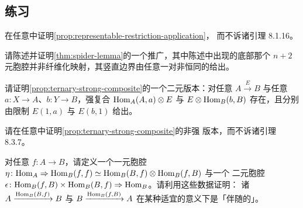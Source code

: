\subsection*{练习}

\begin{exercise}\label{ex:companion-conjoint-any-equipment}
在任意\trVirtualEquipment{}中证明\cref{prop:representable-restriction-application}，
而不诉诸引理 8.1.16。
\end{exercise}

\begin{exercise}\label{ex:spider-generalization}
请陈述并证明\cref{thm:spider-lemma}的一个推广，其中陈述中出现的底部那个
$n+2$ 元胞腔并非纤维化映射，其竖直边界由任意一对非恒同的\trFunctor{}给出。
\end{exercise}

\begin{exercise}\label{ex:binary-strong-composites}
请证明\cref{prop:ternary-strong-composite}的一个二元版本：对任意\trModule{}
$A\xrightarrow{E}B$ 与任意\trFunctor{} $a\colon X\to A$、$b\colon Y\to B$，强复合
$\mathrm{Hom}_{A}(A,a)\otimes E$ 与 $E\otimes\mathrm{Hom}_{B}(b,B)$ 存在，且分别由限制 $E(1,a)$ 与
$E(b,1)$ 给出。
\end{exercise}

\begin{exercise}\label{ex:nonstrong-ternary}
请在任意\trVirtualEquipment{}中证明\cref{prop:ternary-strong-composite}的非强
版本，而不诉诸引理 8.3.7。
\end{exercise}

\begin{exercise}\label{ex:adjoint-representables}
对任意\trFunctor{} $f\colon A\to B$，请定义一个\trCanonical{}一元胞腔
$\eta\colon\mathrm{Hom}_{A}\Rightarrow\mathrm{Hom}_{B}(f,f)\simeq\mathrm{Hom}_{B}(B,f)\otimes\mathrm{Hom}_{B}(f,B)$ 与一个
二元胞腔
$\epsilon\colon\mathrm{Hom}_{B}(f,B)\times\mathrm{Hom}_{B}(B,f)\Rightarrow\mathrm{Hom}_{B}$。请利用这些数据证明：
诸\trModule{} $A\xrightarrow{\mathrm{Hom}_{B}(B,f)}B$ 与
$B\xrightarrow{\mathrm{Hom}_{B}(f,B)}A$ 在某种适宜的意义下是「伴随的」。
\end{exercise}


